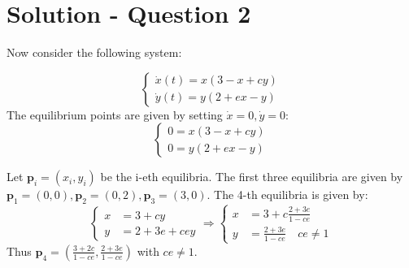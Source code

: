 \section*{Solution - Question 2}
Now consider the following system:

$$
    \left\{\begin{aligned} 
      \dot{x}(t) = x(3-x+cy) \\
      \dot{y}(t) = y(2+ex-y)
    \end{aligned}\right.
$$
The equilibrium points are given by setting $\dot{x}=0, \dot{y}=0$:
$$
    \left\{\begin{aligned} 
      0 = x(3-x+cy) \\
      0 = y(2+ex-y)
    \end{aligned}\right.
$$

Let $\mathbf{p}_i = (x_i,y_i)$ be the i-eth equilibria. The first three equilibria are given by $\mathbf{p}_1 = (0,0), \mathbf{p}_2 = (0,2), \mathbf{p}_3 = (3,0)$. The 4-th equilibria is given by:
$$
    \left\{\begin{aligned}
     x &= 3+cy \\
     y&= 2+3e+cey
    \end{aligned}\right. \Rightarrow
    \left\{\begin{aligned}
     x &= 3+c\frac{2+3e}{1-ce} \\
     y&= \frac{2+3e}{1-ce}\quad ce \neq 1
    \end{aligned}\right.
$$
Thus $\mathbf{p}_4 = ( \frac{3+2c}{1-ce}, \frac{2+3e}{1-ce})$ with $ce \neq 1$.

